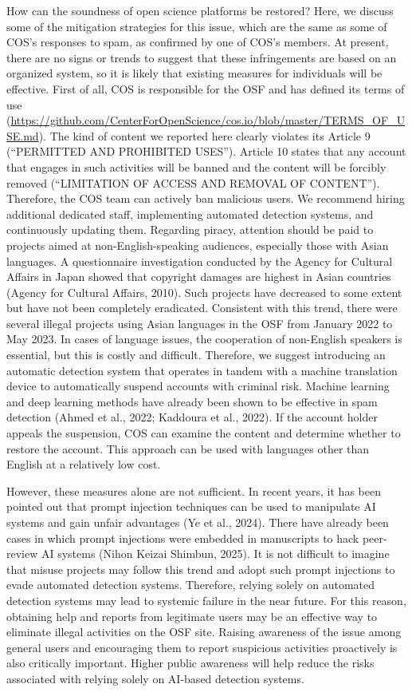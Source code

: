 \documentclass[authordate, meta, issue]{jote-new-article}
\begin{document}
	How can the soundness of open science platforms be restored? Here, we discuss some of the mitigation strategies for this issue, which are the same as some of COS's responses to spam, as confirmed by one of COS's members. At present, there are no signs or trends to suggest that these infringements are based on an organized system, so it is likely that existing measures for individuals will be effective. First of all, COS is responsible for the OSF and has defined its terms of use (\url{https://github.com/CenterForOpenScience/cos.io/blob/master/TERMS\_OF\_USE.md}). The kind of content we reported here clearly violates its Article 9 (“PERMITTED AND PROHIBITED USES”). Article 10 states that any account that engages in such activities will be banned and the content will be forcibly removed (“LIMITATION OF ACCESS AND REMOVAL OF CONTENT”). Therefore, the COS team can actively ban malicious users. We recommend hiring additional dedicated staff, implementing automated detection systems, and continuously updating them. Regarding piracy, attention should be paid to projects aimed at non-English-speaking audiences, especially those with Asian languages. A questionnaire investigation conducted by the Agency for Cultural Affairs in Japan showed that copyright damages are highest in Asian countries (Agency for Cultural Affairs, 2010). Such projects have decreased to some extent but have not been completely eradicated. Consistent with this trend, there were several illegal projects using Asian languages in the OSF from January 2022 to May 2023. In cases of language issues, the cooperation of non-English speakers is essential, but this is costly and difficult. Therefore, we suggest introducing an automatic detection system that operates in tandem with a machine translation device to automatically suspend accounts with criminal risk. Machine learning and deep learning methods have already been shown to be effective in spam detection (Ahmed et al., 2022; Kaddoura et al., 2022). If the account holder appeals the suspension, COS can examine the content and determine whether to restore the account. This approach can be used with languages other than English at a relatively low cost.



	However, these measures alone are not sufficient. In recent years, it has been pointed out that prompt injection techniques can be used to manipulate AI systems and gain unfair advantages (Ye et al., 2024). There have already been cases in which prompt injections were embedded in manuscripts to hack peer-review AI systems (Nihon Keizai Shimbun, 2025). It is not difficult to imagine that misuse projects may follow this trend and adopt such prompt injections to evade automated detection systems. Therefore, relying solely on automated detection systems may lead to systemic failure in the near future. For this reason, obtaining help and reports from legitimate users may be an effective way to eliminate illegal activities on the OSF site. Raising awareness of the issue among general users and encouraging them to report suspicious activities proactively is also critically important. Higher public awareness will help reduce the risks associated with relying solely on AI-based detection systems.
\end{document}
